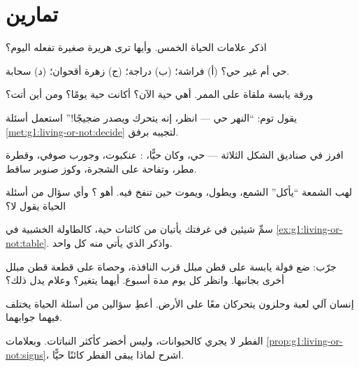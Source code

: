 \section{تمارين}

\begin{exercise}[$\star$]\label{exo:g1:living-or-not:1}
اذكر علامات الحياة الخمس. وأيها ترى هريرة صغيرة تفعله اليوم؟
\end{exercise}

\begin{exercise}[$\star$]\label{exo:g1:living-or-not:2}
حي أم غير حي؟ (أ) فراشة؛ (ب) دراجة؛ (ج) زهرة أقحوان؛ (د) سحابة.
\end{exercise}

\begin{exercise}[$\star$]\label{exo:g1:living-or-not:3}
ورقة يابسة ملقاة على الممر. أهي حية الآن؟ أكانت حية يومًا؟ ومن
أين أتت؟
\end{exercise}

\begin{exercise}[$\star$]\label{exo:g1:living-or-not:4}
يقول توم: ``النهر حي --- انظر، إنه يتحرك ويصدر ضجيجًا!'' استعمل
أسئلة \cref{met:g1:living-or-not:decide} لتجيبه برفق.
\end{exercise}

\begin{exercise}[$\star$]\label{exo:g1:living-or-not:5}
افرز في صناديق الشكل الثلاثة --- حي، وكان حيًّا، :
عنكبوت، وجورب صوفي، وقطرة مطر، وتفاحة على الشجرة، وكوز صنوبر ساقط.
\end{exercise}

\begin{exercise}[$\star$]\label{exo:g1:living-or-not:6}
لهب الشمعة ``يأكل'' الشمع، ويطول، ويموت حين تنفخ فيه. أهو ؟ وأي سؤال من أسئلة الحياة يقول لا؟
\end{exercise}

\begin{exercise}[$\star$]\label{exo:g1:living-or-not:7}
سمِّ شيئين في غرفتك يأتيان من كائنات حية، كالطاولة الخشبية في
\cref{ex:g1:living-or-not:table}. واذكر  الذي يأتي منه
كل واحد.
\end{exercise}

\begin{exercise}[$\star$]\label{exo:g1:living-or-not:8}
جرّب: ضع فولة يابسة على قطن مبلل قرب النافذة، وحصاة على قطعة قطن
مبلل أخرى بجانبها. وانظر كل يوم مدة أسبوع. أيهما يتغير؟ وعلام يدل
ذلك؟
\end{exercise}

\begin{exercise}[$\star\star$]\label{exo:g1:living-or-not:9}
إنسان آلي لعبة وحلزون يتحركان معًا على الأرض. أعطِ سؤالين من أسئلة
الحياة يختلف فيهما جوابهما.
\end{exercise}

\begin{exercise}[$\star\star$]\label{exo:g1:living-or-not:10}
الفطر لا يجري كالحيوانات، وليس أخضر كأكثر النباتات. وبعلامات
\cref{prop:g1:living-or-not:signs}، اشرح لماذا يبقى الفطر كائنًا
حيًّا.
\end{exercise}
